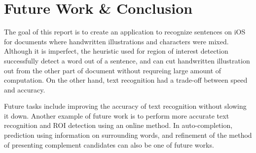 \section{Future Work \& Conclusion}
\label{section:conclusion}

The goal of this report is to create an application to recognize sentences
on iOS for documents where handwritten illustrations and characters were mixed.
Although it is imperfect, the heuristic used for region of interest detection successfully
detect a word out of a sentence, and can cut handwritten illustration out from the other
part of document without requreing large amount of computation.
On the other hand, text recognition had a trade-off between speed and accuracy.

Future tasks include improving the accuracy of text recognition without slowing it down.
Another example of future work is to perform more accurate text recognition and ROI detection
using an online method. In auto-completion, prediction using information on surrounding words,
and refinement of the method of presenting complement candidates can also be one of future works.
